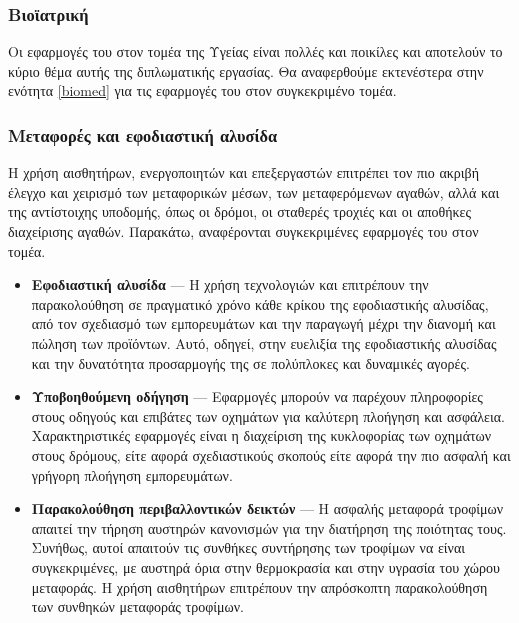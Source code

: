\subsubsection{Βιοϊατρική}
Οι εφαρμογές του  στον τομέα της Υγείας είναι πολλές και ποικίλες και αποτελούν το κύριο θέμα αυτής της διπλωματικής εργασίας. Θα αναφερθούμε εκτενέστερα στην ενότητα \ref{biomed} για τις εφαρμογές του  στον συγκεκριμένο τομέα.
\subsubsection{Μεταφορές και εφοδιαστική αλυσίδα}
Η χρήση αισθητήρων, ενεργοποιητών και επεξεργαστών επιτρέπει τον πιο ακριβή έλεγχο και χειρισμό των μεταφορικών μέσων, των μεταφερόμενων αγαθών, αλλά και της αντίστοιχης υποδομής, όπως οι δρόμοι, οι σταθερές τροχιές και οι αποθήκες διαχείρισης αγαθών.
Παρακάτω, αναφέρονται συγκεκριμένες εφαρμογές του  στον τομέα.
\begin{itemize}
    \item \textbf{Εφοδιαστική αλυσίδα} --- Η χρήση τεχνολογιών  και  επιτρέπουν την παρακολούθηση σε πραγματικό χρόνο κάθε κρίκου της εφοδιαστικής αλυσίδας, από τον σχεδιασμό των εμπορευμάτων και την παραγωγή μέχρι την διανομή και πώληση των προϊόντων.
    Αυτό, οδηγεί, στην ευελιξία της εφοδιαστικής αλυσίδας και την δυνατότητα προσαρμογής της σε πολύπλοκες και δυναμικές αγορές.
    \item \textbf{Υποβοηθούμενη οδήγηση} --- Εφαρμογές  μπορούν να παρέχουν πληροφορίες στους οδηγούς και επιβάτες των οχημάτων για καλύτερη πλοήγηση και ασφάλεια. Χαρακτηριστικές εφαρμογές είναι η διαχείριση της κυκλοφορίας των οχημάτων στους δρόμους, είτε αφορά σχεδιαστικούς σκοπούς είτε αφορά την πιο ασφαλή και γρήγορη πλοήγηση εμπορευμάτων.
    \item \textbf{Παρακολούθηση περιβαλλοντικών δεικτών} --- Η ασφαλής μεταφορά τροφίμων απαιτεί την τήρηση αυστηρών κανονισμών για την διατήρηση της ποιότητας τους.
    Συνήθως, αυτοί απαιτούν τις συνθήκες συντήρησης των τροφίμων να είναι συγκεκριμένες, με αυστηρά όρια στην θερμοκρασία και στην υγρασία του χώρου μεταφοράς. Η χρήση αισθητήρων επιτρέπουν την απρόσκοπτη παρακολούθηση των συνθηκών μεταφοράς τροφίμων.
\end{itemize}

